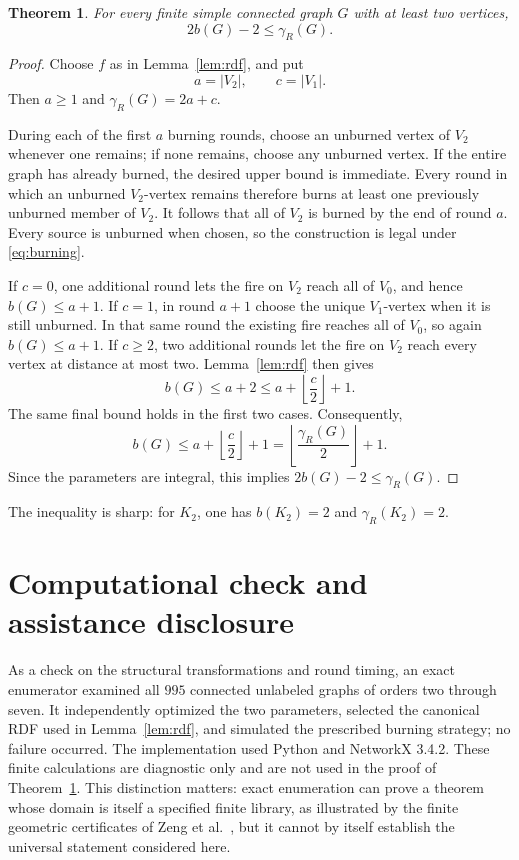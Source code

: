 \documentclass[11pt]{article}
\newtheorem{theorem}{Theorem}
\begin{document}
\begin{theorem}\label{thm:main}
For every finite simple connected graph $G$ with at least two vertices,
\[
  2b(G)-2\leq \gamma_R(G).
\]
\end{theorem}

\begin{proof}
Choose $f$ as in Lemma~\ref{lem:rdf}, and put
\[
  a=|V_2|,\qquad c=|V_1|.
\]
Then $a\geq1$ and $\gamma_R(G)=2a+c$.

During each of the first $a$ burning rounds, choose an unburned vertex of
$V_2$ whenever one remains; if none remains, choose any unburned vertex.  If
the entire graph has already burned, the desired upper bound is immediate.
Every round in which an unburned $V_2$-vertex remains therefore burns at least
one previously unburned member of $V_2$.  It follows that all of $V_2$ is
burned by the end of round $a$.  Every source is unburned when chosen, so the
construction is legal under \eqref{eq:burning}.

If $c=0$, one additional round lets the fire on $V_2$ reach all of $V_0$,
and hence $b(G)\leq a+1$.  If $c=1$, in round $a+1$ choose the unique
$V_1$-vertex when it is still unburned.  In that same round the existing fire
reaches all of $V_0$, so again $b(G)\leq a+1$.  If $c\geq2$, two additional
rounds let the fire on $V_2$ reach every vertex at distance at most two.
Lemma~\ref{lem:rdf} then gives
\[
  b(G)\leq a+2\leq a+\left\lfloor\frac c2\right\rfloor+1.
\]
The same final bound holds in the first two cases.  Consequently,
\[
  b(G)\leq a+\left\lfloor\frac c2\right\rfloor+1
       =\left\lfloor\frac{\gamma_R(G)}2\right\rfloor+1.
\]
Since the parameters are integral, this implies
$2b(G)-2\leq\gamma_R(G)$.
\end{proof}

The inequality is sharp: for $K_2$, one has $b(K_2)=2$ and
$\gamma_R(K_2)=2$.

\section{Computational check and assistance disclosure}

As a check on the structural transformations and round timing, an exact
enumerator examined all $995$ connected unlabeled graphs of orders two
through seven.  It independently optimized the two parameters, selected the
canonical RDF used in Lemma~\ref{lem:rdf}, and simulated the prescribed
burning strategy; no failure occurred.  The implementation used Python and
NetworkX 3.4.2.  These finite calculations are diagnostic only and are not
used in the proof of Theorem~\ref{thm:main}.  This distinction matters: exact
enumeration can prove a theorem whose domain is itself a specified finite
library, as illustrated by the finite geometric certificates of Zeng et
al.~\cite{ZengEtAl2026}, but it cannot by itself establish the universal
statement considered here.
\end{document}
